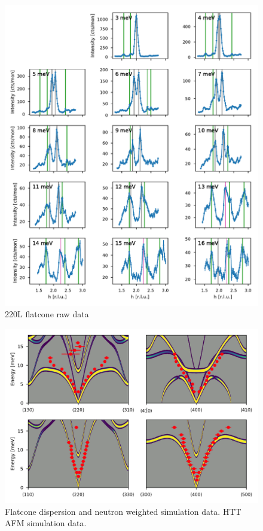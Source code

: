 \begin{figure}
    \centering
    \includegraphics[width=\textwidth]{fig/lowen/fits_220L.pdf}
    \caption[220L flatcone raw data]{220L flatcone raw data}
\end{figure}

\begin{figure}[]
    \centering
    \includegraphics[width=\textwidth]{fig/lowen/flatcone_fits_simulation_htt_afm.png}
    \caption[Flatcone dispersion and neutron weighted simulation data]{Flatcone dispersion and neutron weighted simulation data. HTT AFM simulation data.}
\end{figure}

